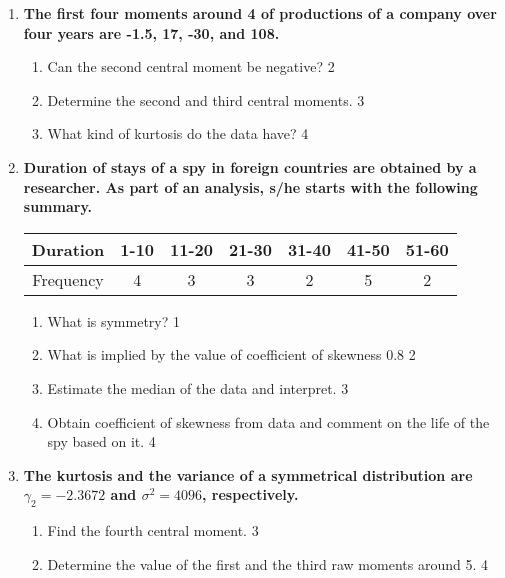 \documentclass[a4paper,oneside]{book}
\begin{document}
  \begin{enumerate}
  
   \item
	  \textbf{The first four moments around 4 of productions of a company over four years are -1.5, 17, -30, and 108.} 
  
  \begin{enumerate}
    \item
	Can the second central moment be negative? \hfill 2
    \item  
	Determine the second and third central moments. \hfill 3
    \item
	What kind of kurtosis do the data have? \hfill 4
  \end{enumerate}

   \item
	  \textbf{Duration of stays of a spy in foreign countries are obtained by a researcher. As part of an analysis, s/he starts with the following summary.} 
	  
	  \begin{table}[h]
	  \centering
\begin{tabular}{c|cccccc}
Duration & 1-10 & 11-20 & 21-30 & 31-40 & 41-50 & 51-60 \\ \hline
Frequency & 4 & 3 & 3 & 2 & 5 & 2
\end{tabular}
\end{table}
  
  \begin{enumerate}
    \item
	What is symmetry? \hfill 1
    \item
	What is implied by the value of coefficient of skewness 0.8 \hfill 2
    \item  
	Estimate the median of the data and interpret. \hfill 3
    \item
	Obtain coefficient of skewness from data and comment on the life of the spy based on it. \hfill 4
  \end{enumerate}
  
   \item
	  \textbf{The kurtosis and the variance of a symmetrical distribution are $\gamma_2 = -2.3672$ and $\sigma^2 = 4096$, respectively.} 
  
  \begin{enumerate}
    \item  
	Find the fourth central moment. \hfill 3
    \item
	Determine the value of the first and the third raw moments around 5. \hfill 4
  \end{enumerate}
  

\end{enumerate}
\end{document}
